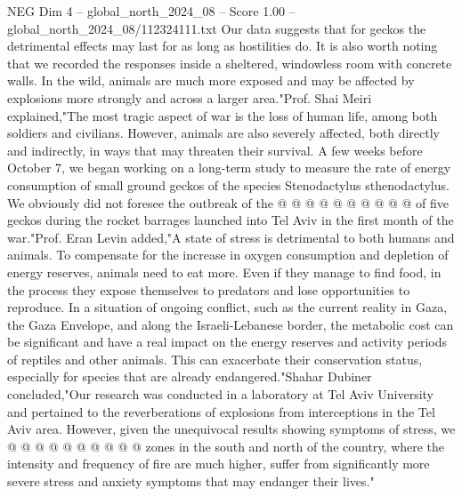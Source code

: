 \begin{textsample}{NEG Dim 4 – global\_north\_2024\_08 – Score 1.00 – global\_north\_2024\_08/112324111.txt}
Our data suggests that for geckos the detrimental effects may last for as long as hostilities do.
It is also worth noting that we recorded the responses inside a sheltered, windowless room with concrete walls.
In the wild, animals are much more exposed and may be affected by explosions more strongly and across a larger area."Prof.
Shai Meiri explained,"The most tragic aspect of war is the loss of human life, among both soldiers and civilians.
However, animals are also severely affected, both directly and indirectly, in ways that may threaten their survival.
A few weeks before October 7, we began working on a long-term study to measure the rate of energy consumption of small ground geckos of the species Stenodactylus sthenodactylus.
We obviously did not foresee the outbreak of the @ @ @ @ @ @ @ @ @ @ of five geckos during the rocket barrages launched into Tel Aviv in the first month of the war."Prof.
Eran Levin added,"A state of stress is detrimental to both humans and animals.
To compensate for the increase in oxygen consumption and depletion of energy reserves, animals need to eat more.
Even if they manage to find food, in the process they expose themselves to predators and lose opportunities to reproduce.
In a situation of ongoing conflict, such as the current reality in Gaza, the Gaza Envelope, and along the Israeli-Lebanese border, the metabolic cost can be significant and have a real impact on the energy reserves and activity periods of reptiles and other animals.
This can exacerbate their conservation status, especially for species that are already endangered."Shahar Dubiner concluded,"Our research was conducted in a laboratory at Tel Aviv University and pertained to the reverberations of explosions from interceptions in the Tel Aviv area.
However, given the unequivocal results showing symptoms of stress, we @ @ @ @ @ @ @ @ @ @ zones in the south and north of the country, where the intensity and frequency of fire are much higher, suffer from significantly more severe stress and anxiety symptoms that may endanger their lives."

\end{textsample}
